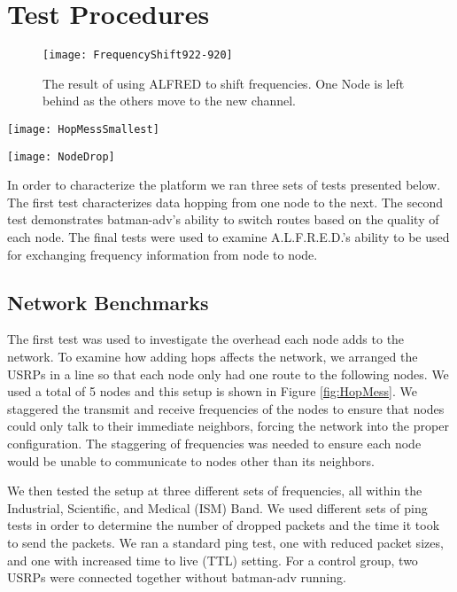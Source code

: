 \section{Test Procedures}

\begin{figure}
	\centering
	\texttt{[image: FrequencyShift922-920]}
	\caption{The result of using ALFRED to shift frequencies. One Node is left behind as the others move to the new channel.}
	\label{fig:freqshift}
\end{figure}


\begin{figure*}
	\centering
	\texttt{[image: HopMessSmallest]}
	\caption{The configuration used for the first set of tests.}
	\label{fig:HopMess}
\end{figure*}

\begin{figure*}
	\centering
	\texttt{[image: NodeDrop]}
	\caption{The configuration used for the second set of tests.}
	\label{fig:NodeDrop}
\end{figure*}

In order to characterize the platform we ran three sets of tests presented below. The first test characterizes data hopping from one node to the next. The second test demonstrates batman-adv's ability to switch routes based on the quality of each node. The final tests were used to examine A.L.F.R.E.D.'s ability to be used for exchanging frequency information from node to node. 

\subsection{Network Benchmarks}

The first test was used to investigate the overhead each node adds to the network. To examine how adding hops affects the network, we arranged the USRPs in a line so that each node only had one route to the following nodes.  We used a total of 5 nodes and this setup is shown in Figure \ref{fig:HopMess}. We staggered the transmit and receive frequencies of the nodes to ensure that nodes could only talk to their immediate neighbors, forcing the network into the proper configuration. The staggering of frequencies was needed to ensure each node would be unable to communicate to nodes other than its neighbors. 

 We then tested the setup at three different sets of frequencies, all within the Industrial, Scientific, and Medical (ISM) Band. We used different sets of ping tests in order to determine the number of dropped packets and the time it took to send the packets. We ran a standard ping test, one with reduced packet sizes, and one with increased time to live (TTL) setting. For a control group, two USRPs were connected together without batman-adv running. 


